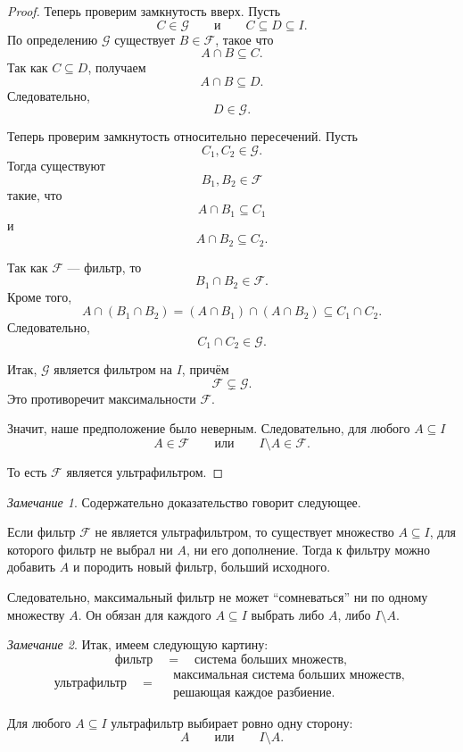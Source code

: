 \documentclass[12pt,a4paper,oneside,openany]{book}
\theoremstyle{definition}
\theoremstyle{plain}
\theoremstyle{remark}
\newtheorem{remark}{Замечание}[chapter]
\begin{document}
\begin{proof}
Теперь проверим замкнутость вверх. Пусть
\[
C\in\mathcal G
\qquad
\text{и}
\qquad
C\subseteq D\subseteq I.
\]
По определению $\mathcal G$ существует $B\in\mathcal F$, такое что
\[
A\cap B\subseteq C.
\]
Так как $C\subseteq D$, получаем
\[
A\cap B\subseteq D.
\]
Следовательно,
\[
D\in\mathcal G.
\]

Теперь проверим замкнутость относительно пересечений. Пусть
\[
C_1,C_2\in\mathcal G.
\]
Тогда существуют
\[
B_1,B_2\in\mathcal F
\]
такие, что
\[
A\cap B_1\subseteq C_1
\]
и
\[
A\cap B_2\subseteq C_2.
\]

Так как $\mathcal F$ — фильтр, то
\[
B_1\cap B_2\in\mathcal F.
\]
Кроме того,
\[
A\cap(B_1\cap B_2)
=
(A\cap B_1)\cap(A\cap B_2)
\subseteq C_1\cap C_2.
\]
Следовательно,
\[
C_1\cap C_2\in\mathcal G.
\]

Итак, $\mathcal G$ является фильтром на $I$, причём
\[
\mathcal F\subsetneq\mathcal G.
\]
Это противоречит максимальности $\mathcal F$.

Значит, наше предположение было неверным. Следовательно, для любого $A\subseteq I$
\[
A\in\mathcal F
\qquad
\text{или}
\qquad
I\setminus A\in\mathcal F.
\]

То есть $\mathcal F$ является ультрафильтром.
\end{proof}

\begin{remark}
Содержательно доказательство говорит следующее.

Если фильтр $\mathcal F$ не является ультрафильтром, то существует множество $A\subseteq I$, для которого фильтр не выбрал ни $A$, ни его дополнение. Тогда к фильтру можно добавить $A$ и породить новый фильтр, больший исходного.

Следовательно, максимальный фильтр не может ``сомневаться'' ни по одному множеству $A$. Он обязан для каждого $A\subseteq I$ выбрать либо $A$, либо $I\setminus A$.
\end{remark}

\begin{remark}
Итак, имеем следующую картину:
\[
\text{фильтр}
\quad
=
\quad
\text{система больших множеств},
\]
\[
\text{ультрафильтр}
\quad
=
\quad
\begin{gathered}
\text{максимальная система больших множеств,}\\
\text{решающая каждое разбиение}.
\end{gathered}
\]

Для любого $A\subseteq I$ ультрафильтр выбирает ровно одну сторону:
\[
A
\qquad
\text{или}
\qquad
I\setminus A.
\]
\end{remark}
\end{document}

